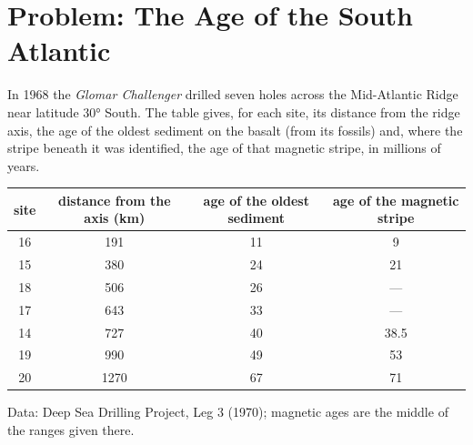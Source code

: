 \section{Problem: The Age of the South Atlantic}

\begin{problem}
\label{pb:g11:drift-to-spreading:1}
In 1968 the \emph{Glomar Challenger} drilled seven holes across the
Mid-Atlantic Ridge near latitude \ang{30} South. The table gives, for each
site, its distance from the ridge axis, the age of the oldest sediment on the
basalt (from its fossils) and, where the stripe beneath it was identified, the
age of that magnetic stripe, in millions of years.

\begin{center}
\small
\begin{tabular}{|c|c|c|c|}
\hline
site & distance from the axis (\unit{km}) & age of the oldest sediment & age of the magnetic stripe \\ \hline
16 & 191 & 11 & 9 \\ \hline
15 & 380 & 24 & 21 \\ \hline
18 & 506 & 26 & --- \\ \hline
17 & 643 & 33 & --- \\ \hline
14 & 727 & 40 & 38.5 \\ \hline
19 & 990 & 49 & 53 \\ \hline
20 & 1270 & 67 & 71 \\ \hline
\end{tabular}

{\small Data: Deep Sea Drilling Project, Leg 3 (1970); magnetic ages are the
middle of the ranges given there.}
\end{center}

\begin{center}


\end{center}
\end{problem}
